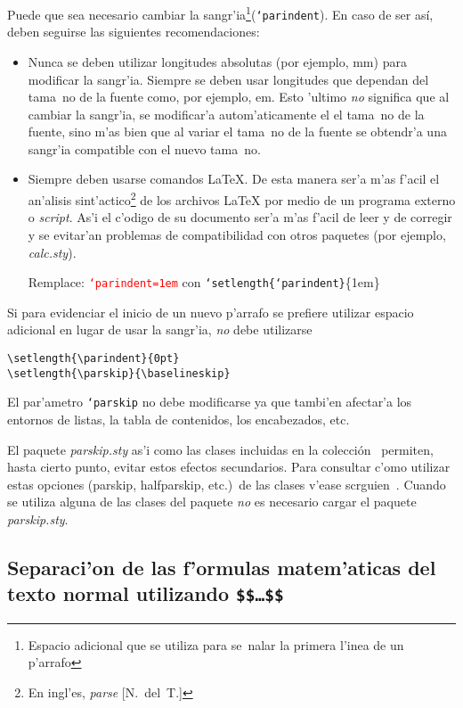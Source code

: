 \documentclass[11pt,a4paper,pagesize,tablecaptionabove,abstracton,pointlessnumbers]{scrartcl}
\newcommand{\gl}{\guillemotleft}
\newcommand{\gr}{\guillemotright}
\newcommand{\Doku}[1]{\textsf{#1}\xspace}
\newcommand{\Paket}[1]{\textsf{\textsl{#1.sty}}\xspace}
\newcommand{\Option}[1]{\textsf{#1}\xspace}
\DeclareRobustCommand*{\Macro}[1]{\mbox{\texttt{\char`\\#1}}}
\DeclareRobustCommand*{\LMacro}[2]{\mbox{\texttt{\char`\\#1\{#2\}}}}
\newcommand{\Ersetze}[2]{\par\noindent Remplace: \textcolor{red}{#1}
  con \textcolor{gruen}{#2}}
\newcommand{\NDT}{[N.~del~T.]}
\begin{document}
Puede que sea necesario cambiar la sangr'ia\footnote{Espacio adicional que se utiliza para se~nalar la primera l'inea de un p'arrafo}(\Macro{parindent}). En caso de ser así, deben seguirse las siguientes recomendaciones:
\begin{itemize}
   \item Nunca se deben utilizar longitudes absolutas (por ejemplo, \gl mm\gr) para modificar la sangr'ia.  Siempre se deben usar longitudes que dependan del tama~no de la fuente como, por ejemplo, \gl em\gr.  Esto 'ultimo \emph{no} significa que al cambiar la sangr'ia, se modificar'a autom'aticamente el el tama~no de la fuente, sino m'as bien que al variar el tama~no de la fuente se obtendr'a una sangr'ia compatible con el nuevo tama~no.
   \item Siempre deben usarse comandos \LaTeX{}. De esta manera ser'a m'as f'acil el an'alisis sint'actico\footnote{En ingl'es, \textit{parse} \NDT} de los archivos \LaTeX{} por medio de un programa externo o \textit{script}. As'i el c'odigo de su documento ser'a m'as f'acil de leer y de corregir y se evitar'an problemas de compatibilidad con otros paquetes (por ejemplo, \Paket{calc}).
  \Ersetze{\Macro{parindent}\texttt{=1em}}{\LMacro{setlength}{\Macro{parindent}}\{1em\}}
\end{itemize}
%
Si para evidenciar el inicio de un nuevo p'arrafo se prefiere utilizar espacio adicional en lugar de usar la sangr'ia, \emph{no} debe utilizarse 
\color{red}
\begin{verbatim}
\setlength{\parindent}{0pt}
\setlength{\parskip}{\baselineskip}
\end{verbatim}
\normalcolor
%
El par'ametro \Macro{parskip} no debe modificarse ya que tambi'en afectar'a los entornos de listas, la tabla de contenidos, los encabezados, etc.

El paquete \Paket{parskip} as'i como las clases incluidas en la colección \KOMAScript\
permiten, hasta cierto punto, evitar estos efectos secundarios. Para consultar c'omo utilizar estas opciones (\Option{parskip}, \Option{halfparskip}, etc.)\ de las clases \KOMAScript{} v'ease \Doku{scrguien}~\cite{kohm:03}. Cuando se utiliza alguna de las clases del paquete \KOMAScript{} \emph{no} es necesario cargar el paquete \Paket{parskip}.

\subsection{Separaci'on de las f'ormulas matem'aticas del texto normal utilizando \texttt{\$\$\dots\$\$}}
\label{sec:abges-form-mit}
\end{document}
